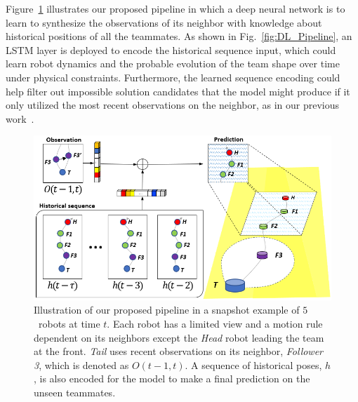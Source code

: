 \documentclass[letterpaper, 10 pt, conference]{ieeeconf}  %
\begin{document}
	Figure~\ref{fig:Concept} illustrates our proposed pipeline in which
	a deep neural network is to learn to synthesize the observations of its neighbor
	with knowledge about historical positions of all the teammates.
	As shown in Fig.~\ref{fig:DL_Pipeline}, an LSTM layer is deployed to encode
    the historical sequence input, which could learn robot dynamics and
    the probable evolution of the team shape over time under physical
    constraints. Furthermore, the learned sequence encoding could help
    filter out impossible solution candidates that the model might
    produce if it only utilized the most recent observations on the neighbor,
    as in our previous work~\cite{CPR17}.
	\begin{figure}\centering
		\includegraphics[width=1.\columnwidth]{fig_Concept}
		\caption{Illustration of our proposed pipeline in a snapshot example of
			$5$~robots at time $t$.
			Each robot has a limited view and a motion rule dependent on its neighbors
			except the \emph{Head} robot leading the team at the front.
			\emph{Tail} uses recent observations on its neighbor, \emph{Follower 3},
			which is denoted as $O(t-1,t)$. A sequence of historical poses, $h$, is
			also encoded for the model to make a final prediction on the
			unseen teammates.
		}
		\label{fig:Concept}
	\end{figure}
\end{document}
